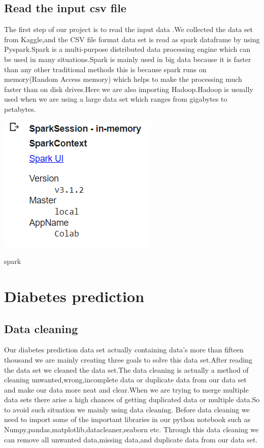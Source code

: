 \documentclass[journal,twoside,web]{ieeecolor}
\begin{document}
\subsection{Read the input csv file}
The first step of our project is to read the input data .We collected the data set from Kaggle,and the CSV file format data set is read as spark dataframe by using Pyspark.Spark is a multi-purpose distributed data processing engine which can be used in many situations.Spark is mainly used in big data because it is faster than any other traditional methods this is because spark runs on memory(Random Access memory) which helps to make the processing much faster than on disk drives.Here we are also importing Hadoop.Hadoop is usually used when we are using a large data set which ranges from gigabytes to petabytes.


\includegraphics[scale=0.8]{spark.png}
\caption{spark}
\label{fig3-spark}

\section{ Diabetes prediction}

\subsection{Data cleaning}
Our diabetes prediction data set actually containing data's more than fifteen thousand we are mainly creating three goals to solve this data set.After reading the data set we cleaned the data set.The data cleaning is actually a method of cleaning unwanted,wrong,incomplete data or duplicate data from our data set and make our data more neat and clear.When we are trying to merge multiple data sets there arise a high chances of getting duplicated data or multiple data.So to avoid such situation we mainly using data cleaning.
Before data cleaning we need to import some of the important libraries in our python notebook such as Numpy,pandas,matplotlib,datacleaner,seaborn etc.
Through this data cleaning we can remove all unwanted data,missing data,and duplicate data from our data set.
\end{document}

